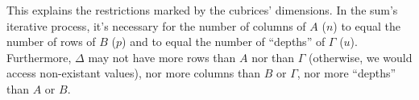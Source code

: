 This explains the restrictions marked by the cubrices' dimensions. In the sum's iterative process, it's necessary for the number of columns of $A$ ($n$) to equal the number of rows of $B$ ($p$) and to equal the number of ``depths'' of $\Gamma$ ($u$). Furthermore, $\Delta$ may not have more rows than $A$ nor than $\Gamma$ (otherwise, we would access non-existant values), nor more columns than $B$ or $\Gamma$, nor more ``depths'' than $A$ or $B$.
